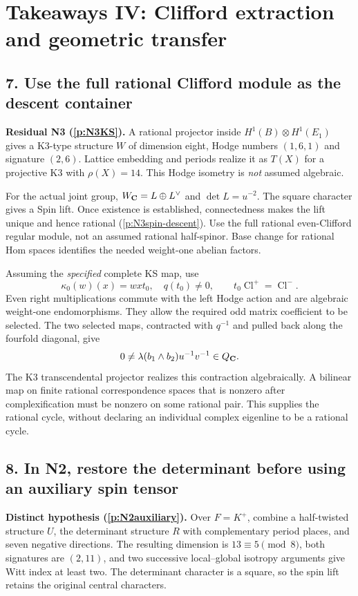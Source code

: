 \section*{Takeaways IV: Clifford extraction and geometric transfer}
\subsection*{7. Use the full rational Clifford module as the descent container}
\textbf{Residual N3 (\ref{p:N3KS}).} A rational projector inside $H^1(B)\otimes H^1(E_1)$ gives a K3-type structure $W$ of dimension eight, Hodge numbers $(1,6,1)$ and signature $(2,6)$. Lattice embedding and periods realize it as $T(X)$ for a projective K3 with $\rho(X)=14$. This Hodge isometry is \emph{not} assumed algebraic.

For the actual joint group, $W_\mathbf C=L\oplus L^\vee$ and $\det L=u^{-2}$. The square character gives a Spin lift. Once existence is established, connectedness makes the lift unique and hence rational (\ref{p:N3spin-descent}). Use the full rational even-Clifford regular module, not an assumed rational half-spinor. Base change for rational Hom spaces identifies the needed weight-one abelian factors.

Assuming the \emph{specified} complete KS map, use
\[
 \kappa_0(w)(x)=wxt_0,\quad q(t_0)\ne0,
 \qquad t_0\operatorname{Cl}^+=\operatorname{Cl}^-.
\]
Even right multiplications commute with the left Hodge action and are algebraic weight-one endomorphisms. They allow the required odd matrix coefficient to be selected. The two selected maps, contracted with $q^{-1}$ and pulled back along the fourfold diagonal, give
\[
           0\ne\lambda(b_1\wedge b_2)u^{-1}v^{-1}\in Q_\mathbf C.
\]
The K3 transcendental projector realizes this contraction algebraically. A bilinear map on finite rational correspondence spaces that is nonzero after complexification must be nonzero on some rational pair. This supplies the rational cycle, without declaring an individual complex eigenline to be a rational cycle.

\subsection*{8. In N2, restore the determinant before using an auxiliary spin tensor}
\textbf{Distinct hypothesis (\ref{p:N2auxiliary}).} Over $F=K^+$, combine a half-twisted structure $U$, the determinant structure $R$ with complementary period places, and seven negative directions. The resulting dimension is $13\equiv5\pmod8$, both signatures are $(2,11)$, and two successive local--global isotropy arguments give Witt index at least two. The determinant character is a square, so the spin lift retains the original central characters.

